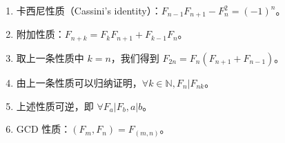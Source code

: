 \begin{enumerate}
    \item 卡西尼性质（Cassini's identity）：$F_{n-1} F_{n+1} - F_n^2 = (-1)^n$。
    \item 附加性质：$F_{n+k} = F_k F_{n+1} + F_{k-1} F_n$。
    \item 取上一条性质中 $k = n$，我们得到 $F_{2n} = F_n (F_{n+1} + F_{n-1})$。
    \item 由上一条性质可以归纳证明，$\forall k\in \mathbb{N},F_n|F_{nk}$。
    \item 上述性质可逆，即 $\forall F_a|F_b,a|b$。
    \item GCD 性质：$(F_m, F_n) = F_{(m, n)}$。
\end{enumerate}
